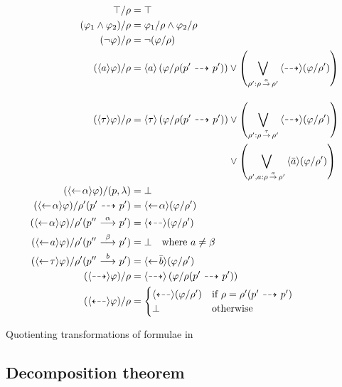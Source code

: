 \begin{table}[t]
    \begin{align*}
        \true / \rho &= \true \\
        (\phi_1 \land \phi_2)/\rho &= \phi_1/\rho  \land \phi_2 / \rho \\
        (\neg\phi)/\rho &= \neg(\phi/\rho) \\
        (\dmnd{a}\phi) / \rho &= \dmnd{a} \left(\phi / \rho(p'\ptrans{} p')\right)
            \lor \left(\bigvee_{\rho' : \rho\transshort{a}\rho'} \pdmnd{} (\phi/\rho') \right)
        \\[1em]
        (\dmnd{\tau}\phi) / \rho &= \dmnd{\tau} \left(\phi / \rho(p'\ptrans{} p')\right)
            \lor \left(\bigvee_{\rho' : \rho\transshort{\tau}\rho'} \pdmnd{} (\phi/\rho') \right) \\
            &\phantom{= \dmnd{\tau} \left(\phi / \rho(p'\ptrans{} p')\right)\;}
            \lor \left( \bigvee_{\rho',a : \rho \transshort{a} \rho'} \dmnd{\bar{a}} (\phi/\rho')  \right) \\
        (\dmndback{\alpha}\phi) / (p,\lambda) &= \false \\
        (\dmndback{\alpha}\phi) / \rho'(p'\ptrans{} p') &= \dmndback{\alpha} (\phi / \rho') \\
        (\dmndback{\alpha}\phi) / \rho'(p''\trans{\alpha} p') &= \pdmndback{} (\phi / \rho') \\
        (\dmndback{a}\phi) / \rho'(p'' \trans{\beta} p') &= \false \quad\textrm{where $a\ne \beta$} \\
        (\dmndback{\tau}\phi) / \rho'(p'' \trans{b} p') &= \dmndback{\bar{b}} (\phi/\rho') \\
        (\pdmnd{}\phi) / \rho &= \pdmnd{} \left( \phi / \rho(p'\ptrans{} p') \right) \\
        (\pdmndback{}\phi) / \rho &= \begin{cases}
            \pdmndback{} (\phi / \rho') & \textrm{if $\rho = \rho'(p' \ptrans{} p')$} \\
            \false & \textrm{otherwise}
        \end{cases}
    \end{align*}
    \caption{Quotienting transformations of formulae in \HMLpp}
    \label{tab:quotients}
\end{table}


\subsection{Decomposition theorem}\label{sub:theorem}

